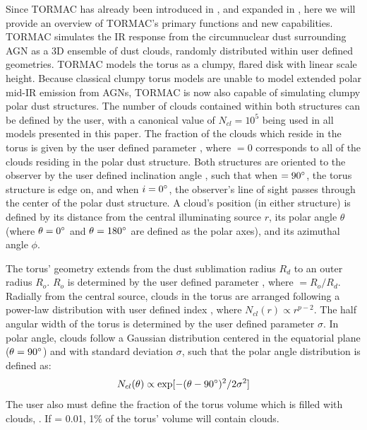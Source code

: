 \par Since TORMAC has already been introduced in \cite{almeyda_modeling_2017}, and expanded in \cite{almeyda_modeling_2020}, here we will provide an overview of TORMAC's primary functions and new capabilities. TORMAC simulates the IR response from the circumnuclear dust surrounding AGN as a 3D ensemble of dust clouds, randomly distributed within user defined geometries. TORMAC models the torus as a clumpy, flared disk with linear scale height. Because classical clumpy torus models are unable to model extended polar mid-IR emission from AGNs, TORMAC is now also capable of simulating clumpy polar dust structures. The number of clouds contained within both structures can be defined by the user, with a canonical value of $N_{cl} = 10^5$ being used in all models presented in this paper. The fraction of the clouds which reside in the torus is given by the user defined parameter \clfrac, where \clfrac $= 0$ corresponds to all of the clouds residing in the polar dust structure. Both structures are oriented to the observer by the user defined inclination angle \inc, such that when \inc $=90\degree$, the torus structure is edge on, and when $i=0\degree$, the observer's line of sight passes through the center of the polar dust structure. A cloud's position (in either structure) is defined by its distance from the central illuminating source $r$, its polar angle $\theta$ (where $\theta = 0\degree$ and $\theta = 180\degree$ are defined as the polar axes), and its azimuthal angle $\phi$. 

\par The torus' geometry extends from the dust sublimation radius $R_d$ to an outer radius $R_o$. $R_o$ is determined by the user defined parameter \Y, where \Y $= R_o/R_d$. Radially from the central source, clouds in the torus are arranged following a power-law distribution with user defined index \p, where $N_{cl}(r) \propto r^{p-2}$. The half angular width of the torus is determined by the user defined parameter $\sigma$. In polar angle, clouds follow a Gaussian distribution centered in the equatorial plane ($\theta = 90\degree$) and with standard deviation $\sigma$, such that the polar angle distribution is defined as:
$$N_{cl}(\theta) \propto \exp[-(\theta - 90\degree)^2/2\sigma^2]$$ 
The user also must define the fraction of the torus volume which is filled with clouds, \vff. If \vff = 0.01, 1\% of the torus’ volume will contain clouds. 

